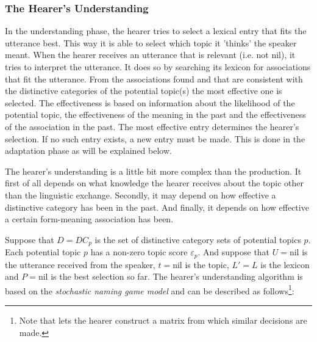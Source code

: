 
\subsubsection{The Hearer's Understanding}\label{s:cm:understanding}

In the understanding phase, the hearer tries to select a lexical entry that fits the utterance best. This way it is able to select which topic it 'thinks' the speaker meant. When the hearer receives an utterance that is relevant (i.e. not nil), it tries to interpret the utterance. It does so by searching its lexicon for associations that fit the utterance. From the associations found and that are consistent with the distinctive categories of the potential topic(s) the most effective one is selected. The effectiveness is based on information about the likelihood of the potential topic, the effectiveness of the meaning in the past and the effectiveness of the association in the past. The most effective entry determines the hearer's selection. If no such entry exists, a new entry must be made. This is done in the adaptation phase as will be explained below.

The hearer's understanding is a little bit more complex than the production. It first of all depends on what knowledge the hearer receives about the topic other than the linguistic exchange. Secondly, it may depend on how effective a distinctive category has been in the past. And finally, it depends on how effective a certain form-meaning association has been. 


Suppose that $D={DC_p}$ is the set of distinctive category sets of potential topics $p$. Each potential topic $p$ has a non-zero topic score $\varepsilon_p$. And suppose that $U=\mbox{nil}$ is the utterance received from the speaker, $t=\mbox{nil}$ is the topic, $L'=L$ is the lexicon and $P=\mbox{nil}$ is the best selection so far. The hearer's understanding algorithm is based on the {\em stochastic naming game model} \citep{steelskaplan:1998} and can be described as follows\footnote{Note that \citet{steelskaplan:1998} lets the hearer construct a matrix from which similar decisions are made.}:

